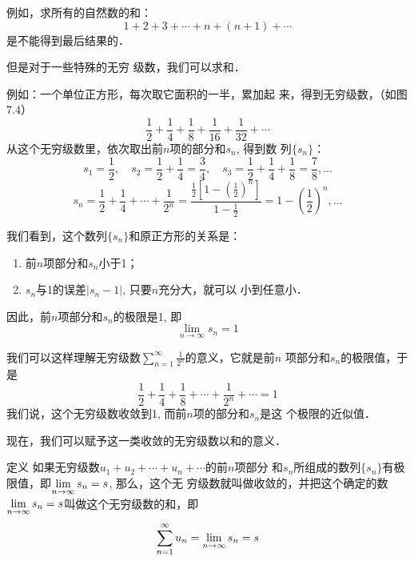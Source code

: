 例如，求所有的自然数的和：
\[1+2+3+\cdots+n+(n+1)+\cdots\]
是不能得到最后结果的．

但是对于一些特殊的无穷
级数，我们可以求和．

\begin{figure}[htp]
    \centering
    \caption{}
\end{figure}

例如：一个单位正方形，每次取它面积的一半，累加起
来，得到无穷级数，（如图7.4）
\[\frac{1}{2}+\frac{1}{4}+\frac{1}{8}+\frac{1}{16}+\frac{1}{32}+\cdots\]
从这个无穷级数里，依次取出前$n$项的部分和$s_n$, 得到数
列$\{s_n\}$：
\[s_1=\frac{1}{2},\quad s_2=\frac{1}{2}+\frac{1}{4}=\frac{3}{4},\quad s_3=\frac{1}{2}+\frac{1}{4}+\frac{1}{8}=\frac{7}{8},\ldots\]
\[s_n=\frac{1}{2}+\frac{1}{4}+\cdots+\frac{1}{2^n}=\frac{\frac{1}{2}\left[1-\left(\frac{1}{2}\right)^n\right]}{1-\frac{1}{2}}=1-\left(\frac{1}{2}\right)^n,\ldots\]

我们看到，这个数列$\{s_n\}$和原正方形的关系是：
\begin{enumerate}
    \item 前$n$项部分和$s_n$小于1；
    \item $s_n$与1的误差$|s_n-1|$, 只要$n$充分大，就可以
小到任意小．
\end{enumerate}
因此，前$n$项部分和$s_n$的极限是1, 即
\[\lim_{n\to\infty} s_n=1 \]

我们可以这样理解无穷级数$\displaystyle\sum_{n=1}^{\infty}\frac{1}{2^n}$的意义，它就是前$n$
项部分和$s_n$的极限值，于是
\[\frac{1}{2}+\frac{1}{4}+\frac{1}{8}+\cdots+\frac{1}{2^n}+\cdots=1 \]
我们说，这个无穷级数收敛到1, 而前$n$项的部分和$s_n$是这
个极限的近似值．

现在，我们可以赋予这一类收敛的无穷级数以和的意义．

\begin{blk}{定义}
    如果无穷级数$u_1+u_2+\cdots+u_n+\cdots$的前$n$项部分
和$s_n$所组成的数列$\{s_n\}$有极限值，即$\displaystyle\lim_{n\to\infty}s_n=s$, 那么，这个无
穷级数就叫做收敛的，并把这个确定的数$\displaystyle\lim_{n\to\infty}s_n=s$叫做这个无穷级数的和，即
\[\sum_{n=1}^{\infty}u_n=\displaystyle\lim_{n\to\infty}s_n=s\]
\end{blk}
 

